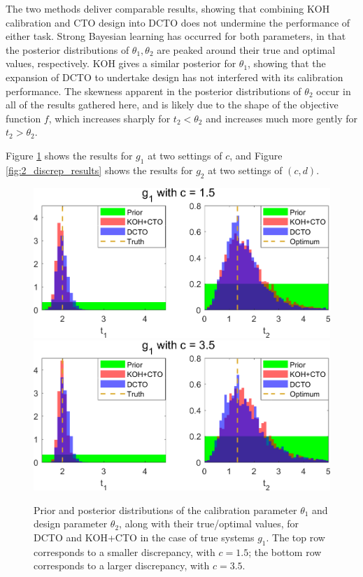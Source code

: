 \documentclass[12pt]{article}
\begin{document}
%
The two methods deliver comparable results, showing that combining KOH calibration and CTO design into DCTO does not undermine the performance of either task.
%
Strong Bayesian learning has occurred for both parameters, in that the posterior distributions of $\theta_1,\theta_2$ are peaked around their true and optimal values, respectively.
%
KOH gives a similar posterior for $\theta_1$, showing that the expansion of DCTO to undertake design has not interfered with its calibration performance.
%
The skewness apparent in the posterior distributions of $\theta_2$ occur in all of the results gathered here, and is likely due to the shape of the objective function $f$, which increases sharply for $t_2<\theta_2$ and increases much more gently for $t_2>\theta_2$.
%

%
Figure \ref{fig:1_discrep_results} shows the results for $g_1$ at two settings of $c$, and Figure \ref{fig:2_discrep_results} shows the results for $g_2$ at two settings of $(c,d)$.
%
\begin{figure}
\centering
\includegraphics[scale=0.85]{FIG_KOHCTO_DCTO_comp_discrep1_results}
\includegraphics[scale=0.85]{FIG_KOHCTO_DCTO_comp_discrep2_results}
\captionsetup{width=.85\linewidth}
\caption{Prior and posterior distributions of the calibration parameter $\theta_1$ and design parameter $\theta_2$, along with their true/optimal values, for DCTO and KOH+CTO in the case of true systems $g_1$. The top row corresponds to a smaller discrepancy, with $c=1.5$; the bottom row corresponds to a larger discrepancy, with $c=3.5$.}
\label{fig:1_discrep_results}
\end{figure}
\end{document}
